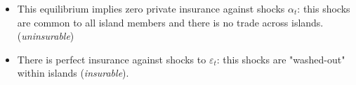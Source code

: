 \documentclass[notes=show]{beamer}
\begin{document}
\bigskip

\begin{frame}%



\begin{itemize}
\item This equilibrium implies zero private insurance against shocks $\alpha
_{t}$: this shocks are common to all island members and there is no trade
across islands. (\textit{uninsurable})

\item There is perfect insurance against shocks to $\varepsilon _{t}$: this
shocks are "washed-out" within islands (\textit{insurable}).
\end{itemize}

\transboxout%
\end{frame}%

\bigskip
\end{document}
